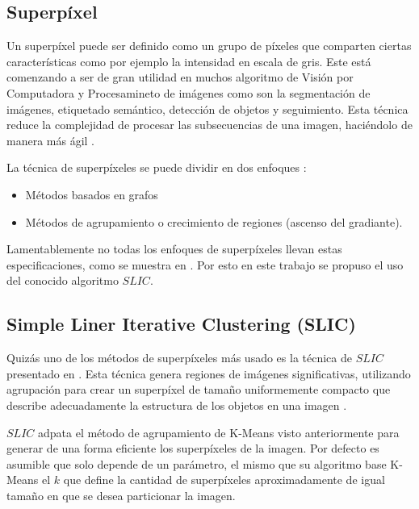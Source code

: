 \documentclass[a4paper,10pt,twocolumn]{article}
\begin{document}
\subsection{Superp\'ixel}\label{sec:superpixel}

Un superp\'ixel puede ser definido como un grupo de p\'ixeles que comparten ciertas caracter\'isticas como por ejemplo la intensidad en escala de gris. Este est\'a comenzando a ser de gran utilidad en muchos algoritmo de Visi\'on por Computadora y Procesamineto de im\'agenes como son la segmentaci\'on de im\'agenes, etiquetado sem\'antico, detecci\'on de objetos y seguimiento. Esta t\'ecnica reduce la complejidad  de procesar las subsecuencias de una imagen, haci\'endolo de manera m\'as \'agil \cite{darshita}.

La t\'ecnica de superp\'ixeles se puede dividir en dos enfoques \cite{mark}:

\begin{itemize} 
	\item M\'etodos basados en grafos 
	\item M\'etodos de agrupamiento o crecimiento de regiones (ascenso del gradiante).
\end{itemize}

Lamentablemente no todas los enfoques de superp\'ixeles llevan estas especificaciones, como se muestra en \cite{achanta}. Por esto en este trabajo se propuso el uso del conocido algoritmo $SLIC$.
\subsection{Simple Liner Iterative Clustering (SLIC)}\label{sec:slic}

Quiz\'as uno de los m\'etodos de superp\'ixeles m\'as usado es la t\'ecnica de $SLIC$ presentado en \cite{perona_malik}. Esta t\'ecnica genera regiones de im\'agenes significativas, utilizando agrupaci\'on para crear un superp\'ixel de tama\~no uniformemente compacto que describe adecuadamente la estructura de los objetos en una imagen \cite{mark}.

$SLIC$ adpata el m\'etodo de agrupamiento de K-Means visto anteriormente para generar de una forma eficiente los superp\'ixeles de la imagen. Por defecto es asumible que solo depende de un par\'ametro, el mismo que su algoritmo base K-Means el $k$ que define la cantidad de superp\'ixeles aproximadamente de igual tama\~no en que se desea particionar la imagen.
\end{document}
